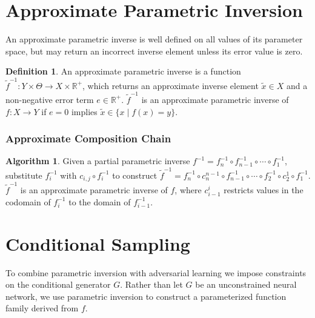 \documentclass{sciposter}
\theoremstyle{definition} %
\newtheorem{definition}{Definition}
\newtheorem{algowizm}{Algorithm}
\newtheorem{theorem}{Theorem}
\newcommand{\apinv}[1]{\widetilde{#1}^{-1}}
\begin{document}
\begin{multicols}{3}

\section{Approximate Parametric Inversion}\label{approximate-parametric-inversion}

An approximate parametric inverse is well defined on all values of its parameter space, but may return an incorrect inverse element unless its error value is zero.

\begin{definition}An approximate parametric inverse is a function $\widetilde{f}^{-1} : Y \times \Theta \to X \times \mathbb{R}^+$, which returns an approximate inverse element $\tilde{x} \in X$ and a non-negative error term $e \in \mathbb{R}^{+}$. $\widetilde{f}^{-1}$ is an approximate parametric inverse of $f:X \to Y$ if
$e=0$ implies $\tilde{x} \in \{x \mid f(x) = y\}$.
\end{definition}



\subsubsection{Approximate Composition Chain}
\begin{algowizm}
\label{algo:approxcompinversion}
Given a partial parametric inverse $f^{-1} = f^{-1}_n \circ f^{-1}_{n-1} \circ \cdots \circ f^{-1}_1$, substitute $f^{-1}_i$ with $c_{i,j} \circ f^{-1}_i$ to construct $\apinv{f} = f^{-1}_n \circ c^{n-1}_{n} \circ f^{-1}_{n-1} \circ \cdots \circ f^{-1}_2 \circ c^1_2 \circ f^{-1}_1$.
$\apinv{f}$ is an approximate parametric inverse of $f$, where $c^i_{i-1}$ restricts values in the codomain of $f^{-1}_i$ to the domain of $f^{-1}_{i-1}$.
\end{algowizm}

\section{Conditional Sampling}

To combine parametric inversion with adversarial learning we impose constraints on the conditional generator $G$.
Rather than let $G$ be an unconstrained neural network, we use parametric inversion to construct a parameterized function family derived from $f$.


\end{multicols}
\end{document}

